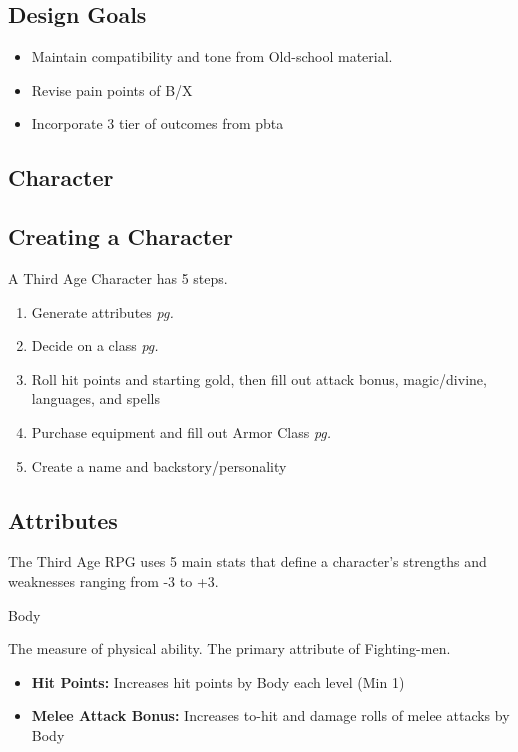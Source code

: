 \documentclass[18pt]{article}
\begin{document}
\subsection*{Design Goals}
\begin{itemize}
	\item Maintain compatibility and tone from Old-school material.
        \item Revise pain points of B/X
        \item Incorporate 3 tier of outcomes from pbta
\end{itemize}
\begin{multicols}{2}
\section*{Character}
\subsection*{Creating a Character}
A Third Age Character has 5 
steps.
\begin{enumerate}
\setlength\itemsep{0em}
	\item Generate attributes \emph{pg. \pageref{label:Attributes}}
	\item Decide on a class \emph{pg. \pageref{label:Class}}
	\item Roll hit points and starting gold, then fill out attack bonus, magic/divine, languages, and spells
	\item Purchase equipment and fill out Armor Class \emph{pg. \pageref{section:Equipment}}
	\item Create a name and backstory/personality %
\end{enumerate}


\subsection*{Attributes}
\label{label:Attributes}
The Third Age RPG uses 5 main stats that define a character's strengths and weaknesses ranging from -3 to +3. 

\begin{mercHeading}
Body
\end{mercHeading}
The measure of physical ability. The primary attribute of Fighting-men.

\begin{itemize}
	\setlength\itemsep{0em}
	\item \textbf{Hit Points:} Increases hit points by Body each level (Min 1)
	\item \textbf{Melee Attack Bonus:} Increases to-hit and damage rolls of melee attacks by Body
\end{itemize}


\end{multicols}
\end{document}
